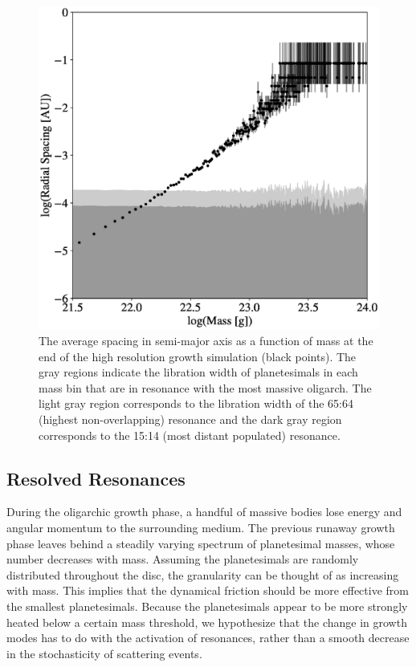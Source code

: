 \begin{figure}
    \includegraphics[width=\columnwidth]{figures/plSS/res_width.eps}
    \caption{The average spacing in semi-major axis as a function of mass at the end of the high resolution growth simulation 
    (black points). The gray regions indicate the libration width of planetesimals in each mass bin that are in resonance with the 
    most massive oligarch. The light gray region corresponds to the libration width of the 65:64 (highest non-overlapping) 
    resonance and the dark gray region corresponds to the 15:14 (most distant populated) resonance.}
    \label{fig:res_mass}
\end{figure}


\subsection{Resolved Resonances}\label{sec:resonances}

During the oligarchic growth phase, a handful of massive bodies lose energy and angular momentum to the surrounding 
medium. The previous runaway growth phase leaves behind a steadily varying spectrum of planetesimal masses, whose number 
decreases with mass. Assuming the planetesimals are randomly distributed throughout the disc, the granularity can be thought 
of as increasing with mass. This implies that the dynamical friction should be more effective from the smallest planetesimals. 
Because the planetesimals appear to be more strongly heated below a certain mass threshold, we hypothesize that the change 
in growth modes has to do with the activation of resonances, rather than a smooth decrease in the stochasticity of scattering 
events.

